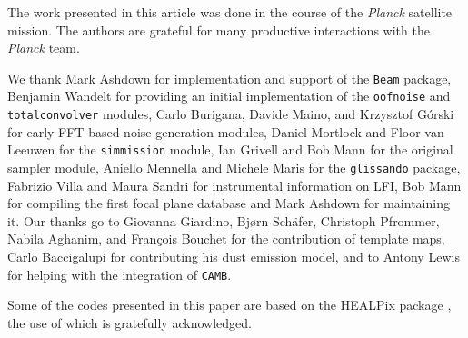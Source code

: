 \documentclass{aa}
\begin{document}
\begin{acknowledgements}

The work presented in this article was done in the course of the
\emph{Planck} satellite mission. The authors are grateful for many
productive interactions with the \emph{Planck} team.

We thank Mark Ashdown for implementation and support of the {\tt Beam} package,
Benjamin Wandelt for providing an initial implementation of
the {\tt oofnoise} and {\tt totalconvolver} modules,
Carlo Burigana, Davide Maino, and Krzysztof G\'orski for early FFT-based
noise generation modules,
Daniel Mortlock and Floor van Leeuwen for the {\tt simmission} module,
Ian Grivell and Bob Mann for the original sampler module,
Aniello Mennella and Michele Maris for the {\tt glissando} package,
Fabrizio Villa and Maura Sandri for instrumental information on LFI,
Bob Mann for compiling the first focal plane database and Mark Ashdown
for maintaining it. Our thanks go to
Giovanna Giardino, Bj\o rn Sch\"afer, Christoph Pfrommer, Nabila Aghanim, and
Fran\c cois Bouchet for the contribution of template maps,
Carlo Baccigalupi for contributing his dust emission model,
and to Antony Lewis for helping with the integration of {\tt CAMB}.

Some of the codes presented in this paper are based on the HEALPix
package \citep{gorski-etal-2005}, the use of which is gratefully acknowledged.

\end{acknowledgements}



\end{document}
